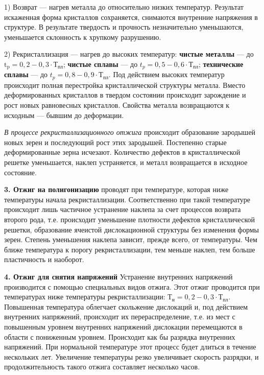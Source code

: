 1) Возврат --- нагрев металла до относительно низких температур. Результат искаженная форма кристаллов сохраняется, снимаются внутренние напряжения в структуре. В результате твердость и прочность незначительно уменьшаются, уменьшается склонность к хрупкому разрушению.

2) Рекристаллизация --- нагрев до высоких температур: \textbf{чистые металлы} --- до $\mathrm{t}_{\mathrm{p}}= 0,2 - 0,3 \cdot \text{Т}_\text{пл}$; \textbf{чистые сплавы} --- до $t_p=0,5-0,6 \cdot \text{Т}_\text{пл}$; \textbf{технические сплавы} --- до $t_p= 0,8-0,9 \cdot \text{Т}_\text{пл}$. Под действием высоких температур происходит полная перестройка кристаллической структуры металла. Вместо деформированных кристаллов в твердом состоянии происходит зарождение и рост новых равновесных кристаллов. Свойства металла возвращаются к исходным --- бывшим до деформации.

\textit{В процессе рекристаллизационного отжига} происходит образование зародышей новых зерен и последующий рост этих зародышей. Постепенно старые деформированные зерна исчезают. Количество дефектов в кристаллической решетке уменьшается, наклеп устраняется, и металл возвращается в исходное состояние.


\textbf{3. Отжиг на полигонизацию} проводят при температуре, которая ниже температуры начала рекристаллизации. Соответственно при такой температуре происходит лишь частичное устранение наклепа за счет процессов возврата второго рода, т.е. происходит уменьшение плотности дефектов кристаллической решетки, образование ячеистой дислокационной структуры без изменения формы зерен. Степень уменьшения наклепа зависит, прежде всего, от температуры. Чем ближе температура к порогу рекристаллизации, тем меньше наклеп, тем больше пластичность и наоборот.


\textbf{4. Отжиг для снятия напряжений} Устранение внутренних напряжений производится с помощью специальных видов отжига. Этот отжиг проводится при температурах ниже температуры рекристаллизации: $\text{Т}_\text{н}= 0,2-0,3 \cdot \text{Т}_\text{пл}$. Повышенная температура облегчает скольжение дислокаций и, под действием внутренних напряжений, происходит их перераспределение, т.е. из мест с повышенным уровнем внутренних напряжений дислокации перемещаются в области с пониженным уровнем. Происходит как бы разрядка внутренних напряжений. При нормальной температуре этот процесс будет длиться в течение нескольких лет. Увеличение температуры резко увеличивает скорость разрядки, и продолжительность такого отжига составляет несколько часов.

